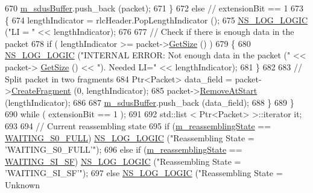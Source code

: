 \begin{DoxyCode}
670           \hyperlink{classns3_1_1LteRlcUm_a8c214e654b315fe09e26db669a6af268}{m\_sdusBuffer}.push\_back (packet);
671         \}
672       \textcolor{keywordflow}{else} \textcolor{comment}{// extensionBit == 1}
673         \{
674           lengthIndicator = rlcHeader.PopLengthIndicator ();
675           \hyperlink{group__logging_ga88acd260151caf2db9c0fc84997f45ce}{NS\_LOG\_LOGIC} (\textcolor{stringliteral}{"LI = "} << lengthIndicator);
676 
677           \textcolor{comment}{// Check if there is enough data in the packet}
678           \textcolor{keywordflow}{if} ( lengthIndicator >= packet->\hyperlink{classns3_1_1Packet_a462855c9929954d4301a4edfe55f4f1c}{GetSize} () )
679             \{
680               \hyperlink{group__logging_ga88acd260151caf2db9c0fc84997f45ce}{NS\_LOG\_LOGIC} (\textcolor{stringliteral}{"INTERNAL ERROR: Not enough data in the packet ("} << packet->
      \hyperlink{classns3_1_1Packet_a462855c9929954d4301a4edfe55f4f1c}{GetSize} () << \textcolor{stringliteral}{"). Needed LI="} << lengthIndicator);
681             \}
682 
683           \textcolor{comment}{// Split packet in two fragments}
684           Ptr<Packet> data\_field = packet->\hyperlink{classns3_1_1Packet_a16f6113606b355b2b346e2245fa2a3d0}{CreateFragment} (0, lengthIndicator);
685           packet->\hyperlink{classns3_1_1Packet_a78aa207e7921dd2f9f7e0d0b7a1c730a}{RemoveAtStart} (lengthIndicator);
686 
687           \hyperlink{classns3_1_1LteRlcUm_a8c214e654b315fe09e26db669a6af268}{m\_sdusBuffer}.push\_back (data\_field);
688         \}
689     \}
690   \textcolor{keywordflow}{while} ( extensionBit == 1 );
691 
692   std::list < Ptr<Packet> >::iterator it;
693 
694   \textcolor{comment}{// Current reassembling state}
695   \textcolor{keywordflow}{if}      (\hyperlink{classns3_1_1LteRlcUm_a633557b2a49dd50bec8c59ce8dacad71}{m\_reassemblingState} == \hyperlink{classns3_1_1LteRlcUm_ae16a0c69b1e6723a7e1f633b53768cd6a24c0e966f1047b74bdbf41fe20b3632b}{WAITING\_S0\_FULL})  
      \hyperlink{group__logging_ga88acd260151caf2db9c0fc84997f45ce}{NS\_LOG\_LOGIC} (\textcolor{stringliteral}{"Reassembling State = 'WAITING\_S0\_FULL'"});
696   \textcolor{keywordflow}{else} \textcolor{keywordflow}{if} (\hyperlink{classns3_1_1LteRlcUm_a633557b2a49dd50bec8c59ce8dacad71}{m\_reassemblingState} == \hyperlink{classns3_1_1LteRlcUm_ae16a0c69b1e6723a7e1f633b53768cd6a84f16b5b0883130f08f944fb996c22ac}{WAITING\_SI\_SF})    
      \hyperlink{group__logging_ga88acd260151caf2db9c0fc84997f45ce}{NS\_LOG\_LOGIC} (\textcolor{stringliteral}{"Reassembling State = 'WAITING\_SI\_SF'"});
697   \textcolor{keywordflow}{else}                                              \hyperlink{group__logging_ga88acd260151caf2db9c0fc84997f45ce}{NS\_LOG\_LOGIC} (\textcolor{stringliteral}{"Reassembling State = Unknown
}
\end{DoxyCode}
